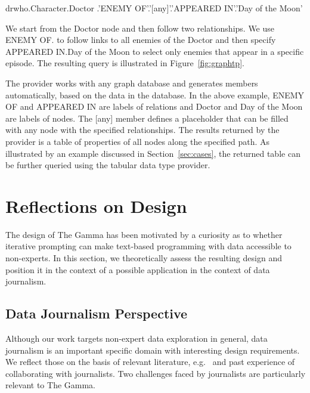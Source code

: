 \documentclass[manuscript,review,anonymous]{acmart}
\newcommand{\ikvd}[1]{{\fontfamily{zi4}\selectfont\small #1}}
\begin{document}
\begin{thegamma}
drwho.Character.Doctor
  .'ENEMY OF'.'[any]'.'APPEARED IN'.'Day of the Moon'
\end{thegamma}

\noindent
We start from the \ikvd{Doctor} node and then follow two relationships. We use
\ikvd{\textquotesingle ENEMY OF\textquotesingle.\textquotesingle [any]\textquotesingle}
to follow links to all enemies of the Doctor and then specify
\ikvd{\textquotesingle APPEARED IN\textquotesingle.\textquotesingle Day of the Moon\textquotesingle}
to select only enemies that appear in a specific episode. The resulting query
is illustrated in Figure~\ref{fig:graphtp}.

The provider works with any graph database and generates members automatically, based on the
data in the database. In the above example, \ikvd{ENEMY OF} and \ikvd{APPEARED IN} are labels
of relations and \ikvd{Doctor} and \ikvd{Day of the Moon} are labels of nodes. The
\ikvd{[any]} member defines a placeholder that can be filled with any node with the specified
relationships. The results returned by the provider is a table of properties of all nodes
along the specified path. As illustrated by an example discussed in Section~\ref{sec:cases},
the returned table can be further queried using the tabular data type provider.


\section{Reflections on Design}
\label{sec:design}

The design of The Gamma has been motivated by a curiosity as to whether iterative
prompting can make text-based programming with data accessible to non-experts. In this section,
we theoretically assess the resulting design and position it in the context of a possible application
in the context of data journalism.

\subsection{Data Journalism Perspective}
\label{sec:design-ddj}

Although our work targets non-expert data exploration in general, data journalism is an important
specific domain with interesting design requirements. We reflect those on the basis of relevant
literature, e.g.~\cite{ddj,edcj17,edcj18} and past experience of collaborating with
journalists. Two challenges faced by journalists \cite{future} are particularly relevant to The Gamma.
\end{document}
